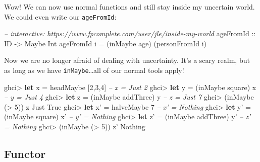 \documentclass[]{article}
\newenvironment{Shaded}{}{}
\newcommand{\KeywordTok}[1]{\textcolor[rgb]{0.00,0.44,0.13}{\textbf{{#1}}}}
\newcommand{\DataTypeTok}[1]{\textcolor[rgb]{0.56,0.13,0.00}{{#1}}}
\newcommand{\DecValTok}[1]{\textcolor[rgb]{0.25,0.63,0.44}{{#1}}}
\newcommand{\CommentTok}[1]{\textcolor[rgb]{0.38,0.63,0.69}{\textit{{#1}}}}
\newcommand{\OtherTok}[1]{\textcolor[rgb]{0.00,0.44,0.13}{{#1}}}
\newcommand{\FunctionTok}[1]{\textcolor[rgb]{0.02,0.16,0.49}{{#1}}}
\newcommand{\NormalTok}[1]{{#1}}
\begin{document}
Wow! We can now use normal functions and still stay inside my uncertain
world. We could even write our \texttt{ageFromId}:

\begin{Shaded}
\begin{Highlighting}[]
\CommentTok{-- interactive: https://www.fpcomplete.com/user/jle/inside-my-world}
\OtherTok{ageFromId ::} \DataTypeTok{ID} \OtherTok{->} \DataTypeTok{Maybe} \DataTypeTok{Int}
\NormalTok{ageFromId i }\FunctionTok{=} \NormalTok{(inMaybe age) (personFromId i)}
\end{Highlighting}
\end{Shaded}

Now we are no longer afraid of dealing with uncertainty. It's a scary
realm, but as long as we have \texttt{inMaybe}\ldots{}all of our normal
tools apply!

\begin{Shaded}
\begin{Highlighting}[]
\NormalTok{ghci}\FunctionTok{>} \KeywordTok{let} \NormalTok{x }\FunctionTok{=} \NormalTok{headMaybe [}\DecValTok{2}\NormalTok{,}\DecValTok{3}\NormalTok{,}\DecValTok{4}\NormalTok{]        }\CommentTok{-- x = Just 2}
\NormalTok{ghci}\FunctionTok{>} \KeywordTok{let} \NormalTok{y }\FunctionTok{=} \NormalTok{(inMaybe square) x       }\CommentTok{-- y = Just 4}
\NormalTok{ghci}\FunctionTok{>} \KeywordTok{let} \NormalTok{z }\FunctionTok{=} \NormalTok{(inMaybe addThree) y     }\CommentTok{-- z = Just 7}
\NormalTok{ghci}\FunctionTok{>} \NormalTok{(inMaybe (}\FunctionTok{>} \DecValTok{5}\NormalTok{)) z}
\DataTypeTok{Just} \DataTypeTok{True}
\NormalTok{ghci}\FunctionTok{>} \KeywordTok{let} \NormalTok{x' }\FunctionTok{=} \NormalTok{halveMaybe }\DecValTok{7}            \CommentTok{-- x' = Nothing}
\NormalTok{ghci}\FunctionTok{>} \KeywordTok{let} \NormalTok{y' }\FunctionTok{=} \NormalTok{(inMaybe square) x'     }\CommentTok{-- y' = Nothing}
\NormalTok{ghci}\FunctionTok{>} \KeywordTok{let} \NormalTok{z' }\FunctionTok{=} \NormalTok{(inMaybe addThree) y'   }\CommentTok{-- z' = Nothing}
\NormalTok{ghci}\FunctionTok{>} \NormalTok{(inMaybe (}\FunctionTok{>} \DecValTok{5}\NormalTok{)) z'}
\DataTypeTok{Nothing}
\end{Highlighting}
\end{Shaded}

\subsection{Functor}\label{functor}
\end{document}
